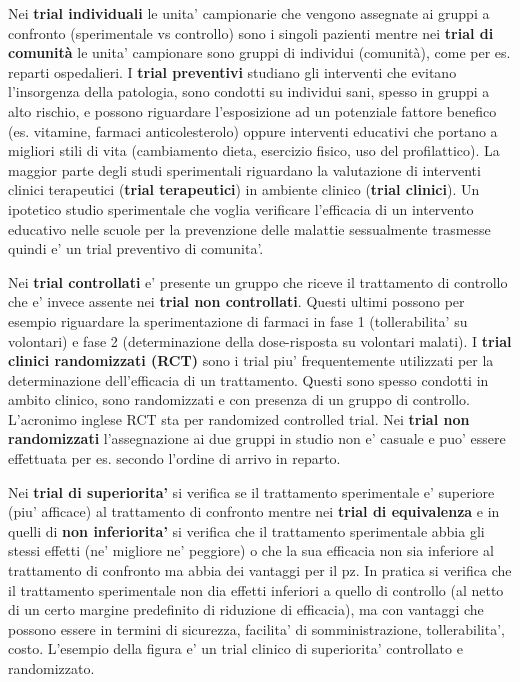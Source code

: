 \documentclass[]{book}
\begin{document}
Nei \textbf{trial individuali} le unita' campionarie che vengono assegnate ai gruppi a confronto (sperimentale vs controllo) sono i singoli pazienti mentre nei \textbf{trial di comunità} le unita' campionare sono gruppi di individui (comunità), come per es. reparti ospedalieri. I \textbf{trial preventivi} studiano gli interventi che evitano l'insorgenza della patologia, sono condotti su individui sani, spesso in gruppi a alto rischio, e possono riguardare l'esposizione ad un potenziale fattore benefico (es. vitamine, farmaci anticolesterolo) oppure interventi educativi che portano a migliori stili di vita (cambiamento dieta, esercizio fisico, uso del profilattico). La maggior parte degli studi sperimentali riguardano la valutazione di interventi clinici terapeutici (\textbf{trial terapeutici}) in ambiente clinico (\textbf{trial clinici}). Un ipotetico studio sperimentale che voglia verificare l'efficacia di un intervento educativo nelle scuole per la prevenzione delle malattie sessualmente trasmesse quindi e' un trial preventivo di comunita'.

Nei \textbf{trial controllati} e' presente un gruppo che riceve il trattamento di controllo che e' invece assente nei \textbf{trial non controllati}. Questi ultimi possono per esempio riguardare la sperimentazione di farmaci in fase 1 (tollerabilita' su volontari) e fase 2 (determinazione della dose-risposta su volontari malati). I \textbf{trial clinici randomizzati (RCT)} sono i trial piu' frequentemente utilizzati per la determinazione dell'efficacia di un trattamento. Questi sono spesso condotti in ambito clinico, sono randomizzati e con presenza di un gruppo di controllo. L'acronimo inglese RCT sta per randomized controlled trial. Nei \textbf{trial non randomizzati} l'assegnazione ai due gruppi in studio non e' casuale e puo' essere effettuata per es. secondo l'ordine di arrivo in reparto.

Nei \textbf{trial di superiorita'} si verifica se il trattamento sperimentale e' superiore (piu' afficace) al trattamento di confronto mentre nei \textbf{trial di equivalenza} e in quelli di \textbf{non inferiorita'} si verifica che il trattamento sperimentale abbia gli stessi effetti (ne' migliore ne' peggiore) o che la sua efficacia non sia inferiore al trattamento di confronto ma abbia dei vantaggi per il pz. In pratica si verifica che il trattamento sperimentale non dia effetti inferiori a quello di controllo (al netto di un certo margine predefinito di riduzione di efficacia), ma con vantaggi che possono essere in termini di sicurezza, facilita' di somministrazione, tollerabilita', costo. L'esempio della figura e' un trial clinico di superiorita' controllato e randomizzato.
\end{document}
